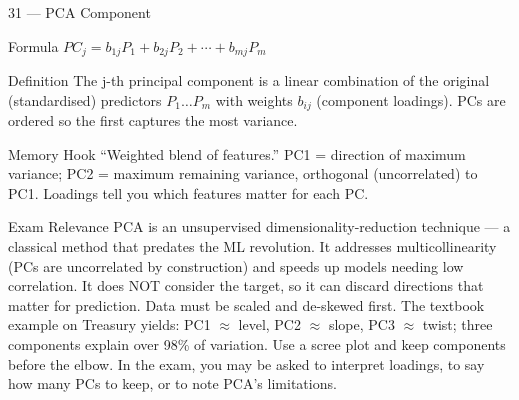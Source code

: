 \documentclass[aspectratio=169,8pt]{beamer}
\begin{document}
	\begin{frame}{31 --- PCA Component}
		\begin{block}{Formula}
			$PC_j = b_{1j}P_1 + b_{2j}P_2 + \cdots + b_{mj}P_m$
		\end{block}
		\begin{block}{Definition}
			The j-th principal component is a linear combination of the original (standardised) predictors $P_1 \dots P_m$ with weights $b_{ij}$ (component loadings). PCs are ordered so the first captures the most variance.
		\end{block}
		\begin{block}{Memory Hook}
			``Weighted blend of features.'' PC1 = direction of maximum variance; PC2 = maximum remaining variance, orthogonal (uncorrelated) to PC1. Loadings tell you which features matter for each PC.
		\end{block}
		\begin{block}{Exam Relevance}
			PCA is an unsupervised dimensionality-reduction technique --- a classical method that predates the ML revolution. It addresses multicollinearity (PCs are uncorrelated by construction) and speeds up models needing low correlation. It does NOT consider the target, so it can discard directions that matter for prediction. Data must be scaled and de-skewed first. The textbook example on Treasury yields: PC1 $\approx$ level, PC2 $\approx$ slope, PC3 $\approx$ twist; three components explain over 98\% of variation. Use a scree plot and keep components before the elbow. In the exam, you may be asked to interpret loadings, to say how many PCs to keep, or to note PCA's limitations.
		\end{block}
	\end{frame}
	
\end{document}
